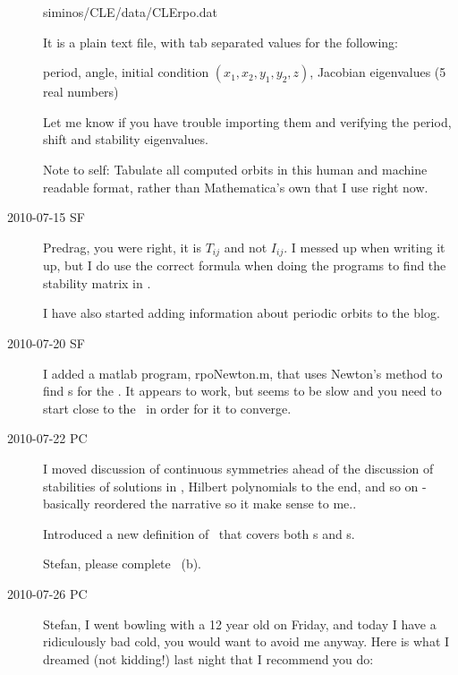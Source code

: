 \begin{description}
siminos/CLE/data/CLErpo.dat

It is a plain text file, with tab separated values for the following:

period, angle, initial condition $(x_1,x_2,y_1,y_2,z)$,
Jacobian eigenvalues (5 real numbers)

Let me know if you have trouble importing them and verifying
the period, shift and stability eigenvalues.

Note to self: Tabulate all computed orbits in this human and machine readable format,
rather than Mathematica's own that I use right now.

\item[2010-07-15 SF]
Predrag, you were right, it is $T_{ij}$ and not $I_{ij}$. I
messed up when writing it up, but I do use the correct
formula when doing the programs to find the stability matrix
in \reducedsp.

I have also started adding information about periodic orbits to the blog.

\item[2010-07-20 SF]
I added a matlab program, rpoNewton.m, that uses Newton's
method to find \rpo s for the \cLe. It appears to work, but
seems to be slow and you need to start close to the \rpo\ in
order for it to converge.


\item[2010-07-22 PC] I moved discussion of continuous
symmetries ahead of the discussion of stabilities of
solutions in , Hilbert polynomials to the
end, and so on - basically reordered the narrative so it make
sense to me..

Introduced a new definition  of \FloquetM\ that covers
both \po s and \rpo s.

Stefan, please complete ~(b).

\item[2010-07-26 PC]
Stefan, I went bowling with a 12 year old on Friday, and
today I have a ridiculously bad cold, you would want to avoid
me anyway. Here is what I dreamed (not kidding!) last night
that I recommend you do:


\end{description}
